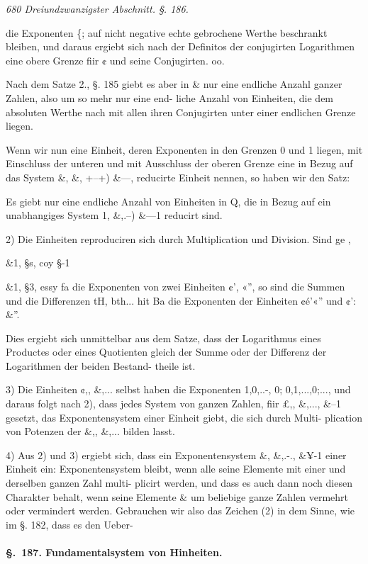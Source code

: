 \documentclass[12pt,a4paper]{article}
\theoremstyle{plain}
\theoremstyle{definition}
\begin{document}
\vspace{0.5\baselineskip}\noindent\textit{680 Dreiundzwanzigster Abschnitt. §. 186.}\par

die Exponenten \{; auf nicht negative echte gebrochene Werthe beschrankt bleiben, und daraus ergiebt sich nach der Definitos der conjugirten Logarithmen eine obere Grenze fiir ¢ und seine Conjugirten. oo.

Nach dem Satze 2., §. 185 giebt es aber in \& nur eine endliche Anzahl ganzer Zahlen, also um so mehr nur eine end- liche Anzahl von Einheiten, die dem absoluten Werthe nach mit allen ihren Conjugirten unter einer endlichen Grenze liegen.

Wenn wir nun eine Einheit, deren Exponenten in den Grenzen 0 und 1 liegen, mit Einschluss der unteren und mit Ausschluss der oberen Grenze eine in Bezug auf das System \&, \&, +--+) \&---, reducirte Einheit nennen, so haben wir den Satz:

Es giebt nur eine endliche Anzahl von Einheiten in Q, die in Bezug auf ein unabhangiges System 1, \&,.--) \&---1 reducirt sind.

2) Die Einheiten reproduciren sich durch Multiplication und Division. Sind ge ,

\&1, §s, coy §-1

\&1, §3, essy fa die Exponenten von zwei Einheiten ¢', «'', so sind die Summen und die Differenzen tH, bth... hit Ba die Exponenten der Einheiten ¢é'«'' und ¢': \&''.

Dies ergiebt sich unmittelbar aus dem Satze, dass der Logarithmus eines Productes oder eines Quotienten gleich der Summe oder der Differenz der Logarithmen der beiden Bestand- theile ist.

3) Die Einheiten ¢,, \&,... selbst haben die Exponenten 1,0,..-, 0; 0,1,...,0;..., und daraus folgt nach 2), dass jedes System von ganzen Zahlen, fiir £,, \&,..., \&--1 gesetzt, das Exponentensystem einer Einheit giebt, die sich durch Multi- plication von Potenzen der \&,, \&,... bilden lasst.

4) Aus 2) und 3) ergiebt sich, dass ein Exponentensystem \&, \&,.-., \&¥-1 einer Einheit ein: Exponentensystem bleibt, wenn alle seine Elemente mit einer und derselben ganzen Zahl multi- plicirt werden, und dass es auch dann noch diesen Charakter behalt, wenn seine Elemente \& um beliebige ganze Zahlen vermehrt oder vermindert werden. Gebrauchen wir also das Zeichen (2) in dem Sinne, wie im §. 182, dass es den Ueber-

\paragraph{\S.~187. Fundamentalsystem von Hinheiten.}
\end{document}
